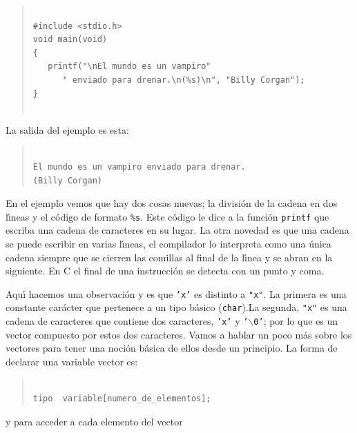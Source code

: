 \begin{quotation}
\begin{verbatim}

#include <stdio.h>
void main(void)
{
   printf("\nEl mundo es un vampiro"
	  " enviado para drenar.\n(%s)\n", "Billy Corgan");
}


\end{verbatim}
\end{quotation}

La salida del ejemplo es esta:

\begin{quotation}
\begin{verbatim}

El mundo es un vampiro enviado para drenar.
(Billy Corgan)

\end{verbatim}
\end{quotation}

En el ejemplo vemos que hay dos cosas nuevas; la divisi\'on de la cadena en 
dos l\'{\i}neas y el c\'odigo de formato \texttt{\%s}. Este c\'odigo le dice a
la funci\'on \texttt{printf} que escriba una cadena de caracteres en su lugar.
La otra novedad es que una cadena se puede escribir en varias l\'{\i}neas,
el compilador lo interpreta como una \'unica cadena siempre que se cierren las
comillas al final de la l\'{\i}nea y se abran en la siguiente. En C el final
de una instrucci\'on se detecta con un punto y coma.

Aqu\'{\i} hacemos una observaci\'on y es que \texttt{'x'} es distinto a
\texttt{"x"}.  La primera es una constante car\'acter que pertenece a un tipo
b\'asico (\texttt{char}).La segunda, \texttt{"x"} es una cadena de 
caracteres que contiene dos caracteres, \texttt{'x'} y 
\texttt{'$\backslash$0'}; por lo que es un vector compuesto por estos dos
caracteres. Vamos a hablar un poco m\'as sobre los vectores para tener una 
noci\'on b\'asica de ellos desde un principio. La forma de declarar una 
variable vector es:


\begin{quotation}
\begin{verbatim}

tipo  variable[numero_de_elementos];

\end{verbatim}
\end{quotation}

y para acceder a cada elemento del vector

